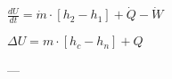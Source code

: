 \( \frac{dU}{dt} = \dot{m} \cdot [h_2 - h_1] + \dot{Q} - \dot{W} \)  

\( \Delta U = m \cdot [h_c - h_n] + Q \)

---